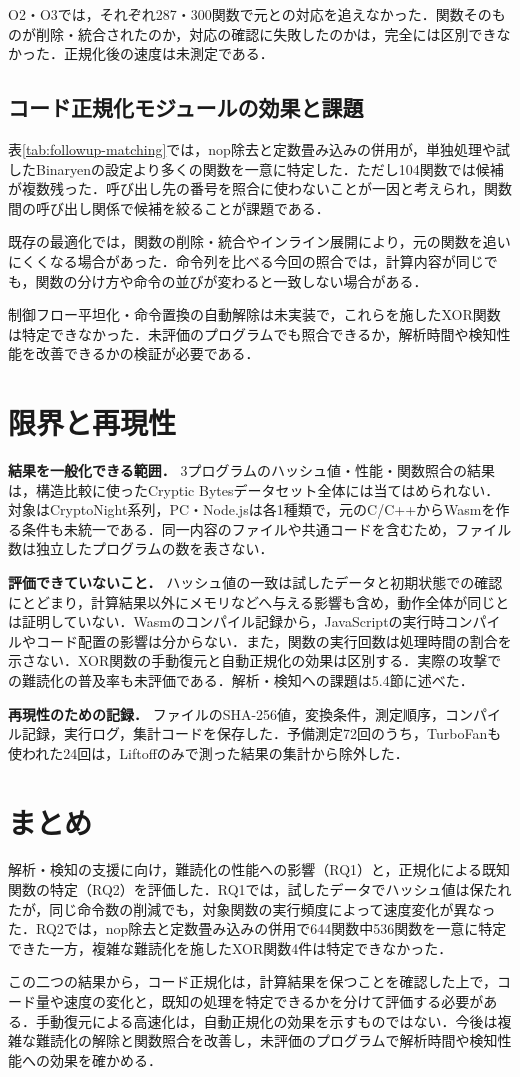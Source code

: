 \documentclass[submit,techrep]{ipsj}
\begin{document}
O2・O3では，それぞれ287・300関数で元との対応を追えなかった．関数そのものが削除・統合されたのか，対応の確認に失敗したのかは，完全には区別できなかった．正規化後の速度は未測定である．

\subsection{コード正規化モジュールの効果と課題}
表\ref{tab:followup-matching}では，nop除去と定数畳み込みの併用が，単独処理や試したBinaryenの設定より多くの関数を一意に特定した．ただし104関数では候補が複数残った．呼び出し先の番号を照合に使わないことが一因と考えられ，関数間の呼び出し関係で候補を絞ることが課題である．

既存の最適化では，関数の削除・統合やインライン展開により，元の関数を追いにくくなる場合があった．命令列を比べる今回の照合では，計算内容が同じでも，関数の分け方や命令の並びが変わると一致しない場合がある．

制御フロー平坦化・命令置換の自動解除は未実装で，これらを施したXOR関数は特定できなかった．未評価のプログラムでも照合できるか，解析時間や検知性能を改善できるかの検証が必要である．

\section{限界と再現性}
\noindent\textbf{結果を一般化できる範囲．}
3プログラムのハッシュ値・性能・関数照合の結果は，構造比較に使ったCryptic Bytesデータセット全体には当てはめられない．対象はCryptoNight系列，PC・Node.jsは各1種類で，元のC/C++からWasmを作る条件も未統一である．同一内容のファイルや共通コードを含むため，ファイル数は独立したプログラムの数を表さない．

\noindent\textbf{評価できていないこと．}
ハッシュ値の一致は試したデータと初期状態での確認にとどまり，計算結果以外にメモリなどへ与える影響も含め，動作全体が同じとは証明していない．Wasmのコンパイル記録から，JavaScriptの実行時コンパイルやコード配置の影響は分からない．また，関数の実行回数は処理時間の割合を示さない．XOR関数の手動復元と自動正規化の効果は区別する．実際の攻撃での難読化の普及率も未評価である．解析・検知への課題は5.4節に述べた．

\noindent\textbf{再現性のための記録．}
ファイルのSHA-256値，変換条件，測定順序，コンパイル記録，実行ログ，集計コードを保存した．予備測定72回のうち，TurboFanも使われた24回は，Liftoffのみで測った結果の集計から除外した．

\section{まとめ}
解析・検知の支援に向け，難読化の性能への影響（RQ1）と，正規化による既知関数の特定（RQ2）を評価した．RQ1では，試したデータでハッシュ値は保たれたが，同じ命令数の削減でも，対象関数の実行頻度によって速度変化が異なった．RQ2では，nop除去と定数畳み込みの併用で644関数中536関数を一意に特定できた一方，複雑な難読化を施したXOR関数4件は特定できなかった．

この二つの結果から，コード正規化は，計算結果を保つことを確認した上で，コード量や速度の変化と，既知の処理を特定できるかを分けて評価する必要がある．手動復元による高速化は，自動正規化の効果を示すものではない．今後は複雑な難読化の解除と関数照合を改善し，未評価のプログラムで解析時間や検知性能への効果を確かめる．
\par



\end{document}
